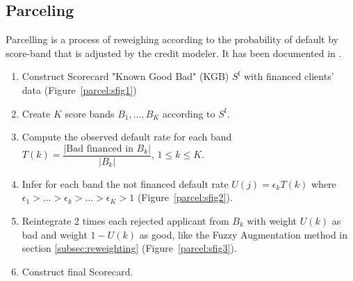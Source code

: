 \subsection{Parceling} \label{Parceling}

Parcelling is a process of reweighing according to the probability of default by score-band that is adjusted by the credit modeler. It has been documented in \cite{saporta,banasik,RI6}.

\begin{enumerate}
\item Construct Scorecard "Known Good Bad" (KGB) $S^{\text{f}}$ with financed clients' data (Figure~\ref{parcel:sfig1})
\item Create $K$ score bands $B_1, \ldots, B_K$ according to $S^{\text{f}}$.
\item Compute the observed default rate for each band $T(k) = \dfrac{|\text{Bad financed in } B_k|}{|B_k|}$, $1 \leq k  \leq K$.
\item Infer for each band the not financed default rate $U(j) = \epsilon_k T(k)$ where $\epsilon_1 > \ldots > \epsilon_k > \ldots > \epsilon_K > 1$ (Figure~\ref{parcel:sfig2}).
\item Reintegrate 2 times each rejected applicant from $B_k$ with weight $U(k)$ as bad and weight $1-U(k)$ as good, like the Fuzzy Augmentation method in section \ref{subsec:reweighting} (Figure~\ref{parcel:sfig3}).
\item Construct final Scorecard.
\end{enumerate}

